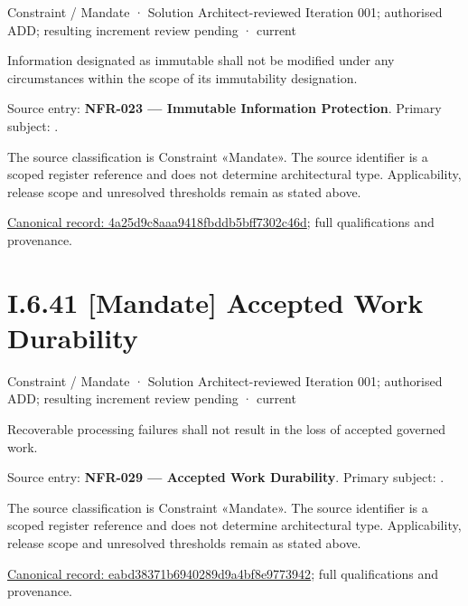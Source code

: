 \label{element:4a25d9c8aaa9418fbddb5bff7302c46d}
{\small Constraint / Mandate · Solution Architect-reviewed Iteration 001; authorised ADD; resulting increment review pending · current}\par

Information designated as immutable shall not be modified under any circumstances within the scope of its immutability designation.



Source entry: \textbf{NFR-023 — Immutable Information Protection}. Primary subject: \texttt{}.



The source classification is Constraint «Mandate». The source identifier is a scoped register reference and does not determine architectural type. Applicability, release scope and unresolved thresholds remain as stated above.


{\footnotesize \href{../../../../continuum/motivation/constraint/mandate/4a25d9c8aaa9418fbddb5bff7302c46d.md}{Canonical record: 4a25d9c8aaa9418fbddb5bff7302c46d}; full qualifications and provenance.}\par
\section*{I.6.41 [Mandate] Accepted Work Durability}
\label{navigation:I.6.41}

\label{element:eabd38371b6940289d9a4bf8e9773942}
{\small Constraint / Mandate · Solution Architect-reviewed Iteration 001; authorised ADD; resulting increment review pending · current}\par

Recoverable processing failures shall not result in the loss of accepted governed work.



Source entry: \textbf{NFR-029 — Accepted Work Durability}. Primary subject: \texttt{}.



The source classification is Constraint «Mandate». The source identifier is a scoped register reference and does not determine architectural type. Applicability, release scope and unresolved thresholds remain as stated above.


{\footnotesize \href{../../../../continuum/motivation/constraint/mandate/eabd38371b6940289d9a4bf8e9773942.md}{Canonical record: eabd38371b6940289d9a4bf8e9773942}; full qualifications and provenance.}\par
